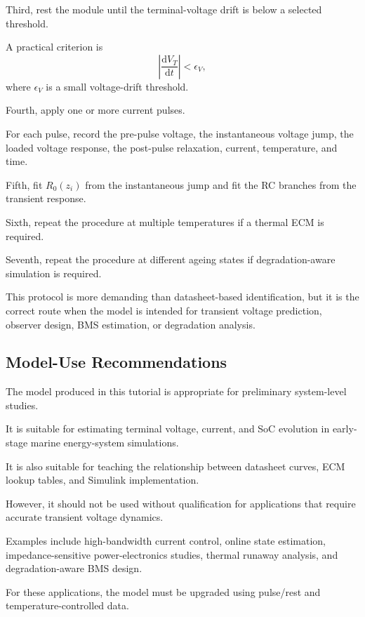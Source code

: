 \documentclass[a4paper,12pt]{article}
\begin{document}
Third, rest the module until the terminal-voltage drift is below a selected threshold.

A practical criterion is
\begin{equation}
\left|
\frac{\mathrm{d}V_T}{\mathrm{d}t}
\right|
<
\epsilon_V,
\label{eq:interp_rest_criterion}
\end{equation}
where \(\epsilon_V\) is a small voltage-drift threshold.

Fourth, apply one or more current pulses.

For each pulse, record the pre-pulse voltage, the instantaneous voltage jump, the loaded voltage response, the post-pulse relaxation, current, temperature, and time.

Fifth, fit \(R_0(z_i)\) from the instantaneous jump and fit the RC branches from the transient response.

Sixth, repeat the procedure at multiple temperatures if a thermal ECM is required.

Seventh, repeat the procedure at different ageing states if degradation-aware simulation is required.

This protocol is more demanding than datasheet-based identification, but it is the correct route when the model is intended for transient voltage prediction, observer design, BMS estimation, or degradation analysis.

\subsection{Model-Use Recommendations}

The model produced in this tutorial is appropriate for preliminary system-level studies.

It is suitable for estimating terminal voltage, current, and SoC evolution in early-stage marine energy-system simulations.

It is also suitable for teaching the relationship between datasheet curves, ECM lookup tables, and Simulink implementation.

However, it should not be used without qualification for applications that require accurate transient voltage dynamics.

Examples include high-bandwidth current control, online state estimation, impedance-sensitive power-electronics studies, thermal runaway analysis, and degradation-aware BMS design.

For these applications, the model must be upgraded using pulse/rest and temperature-controlled data.
\end{document}
